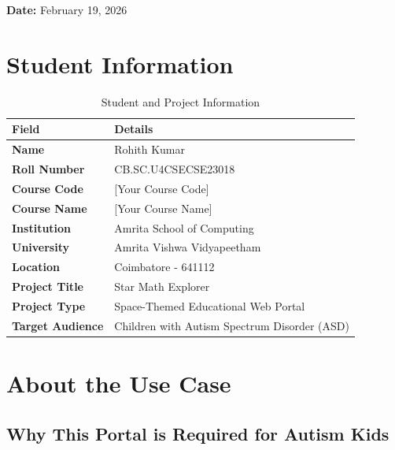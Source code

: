 \documentclass[12pt, a4paper]{article}
\begin{document}
\begin{titlepage}
    \vfill
    
    {\large \color{spacepurple}\textbf{Date:} February 19, 2026\par}
    
\end{titlepage}

\newpage
\tableofcontents
\newpage

\section{Student Information}

\begin{table}[H]
\centering
\begin{tabular}{|>{\bfseries}p{4cm}|p{10cm}|}
\hline
\rowcolor{electricblue!20}
\textbf{Field} & \textbf{Details} \\
\hline
Name & Rohith Kumar \\
\hline
Roll Number & CB.SC.U4CSECSE23018 \\
\hline
Course Code & [Your Course Code] \\
\hline
Course Name & [Your Course Name] \\
\hline
Institution & Amrita School of Computing \\
\hline
University & Amrita Vishwa Vidyapeetham \\
\hline
Location & Coimbatore - 641112 \\
\hline
Project Title & Star Math Explorer \\
\hline
Project Type & Space-Themed Educational Web Portal \\
\hline
Target Audience & Children with Autism Spectrum Disorder (ASD) \\
\hline
\end{tabular}
\caption{Student and Project Information}
\end{table}

\section{About the Use Case}

\subsection{Why This Portal is Required for Autism Kids}
\end{document}
